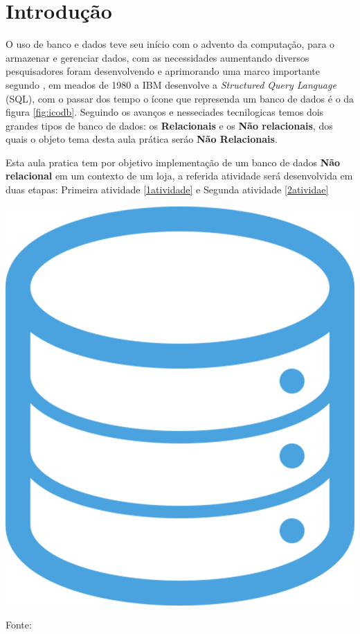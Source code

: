 
\section{Introdução}


\noindent \begin{minipage}[c]{0.6\textwidth}
\par O uso de banco e dados teve seu início com o advento da computação, para o armazenar e gerenciar dados, com as necessidades aumentando diversos pesquisadores foram desenvolvendo e aprimorando uma marco importante segundo \cite{histdb:2024}, em meados de 1980 a IBM desenvolve a \textit{Structured Query Language} (SQL), com o passar dos tempo o ícone que represenda um banco de dados é o da figura \ref{fig:icodb}. Seguindo os avanços e nesseciades tecnilogicas temos dois grandes tipos de banco de dados: os \textbf{Relacionais} e os \textbf{Não relacionais}, dos quais o objeto tema desta aula prática seráo \textbf{Não Relacionais}.
\par Esta aula pratica tem por objetivo implementação de um banco de dados \textbf{Não relacional} em um contexto de um loja, a referida atividade será desenvolvida em duas etapas: Primeira atividade \ref{1atividade} e Segunda atividade \ref{2atividae}


\end{minipage}
\begin{minipage}[c]{0.4\textwidth}
  \includegraphics[width=\textwidth]{figure/pngegg.png}
  \label{fig:icodb}

  {\fontsize{10pt}{\baselineskip}\selectfont
    Fonte: }
\end{minipage}


